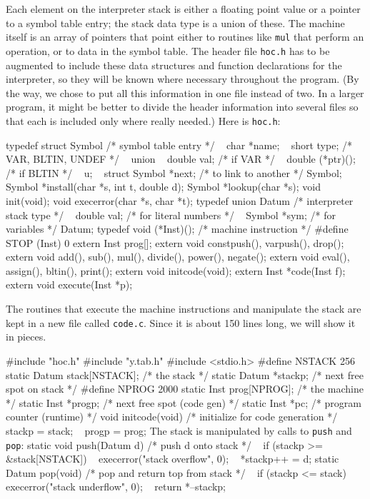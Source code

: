 {Each element on the interpreter stack is either a floating point
value or a pointer to a symbol table entry; the stack data type
is a union of these. The machine itself is an array of pointers
that point either to routines like {\tt mul} that perform an
operation, or to data in the symbol table.
The header file {\tt hoc.h} has to be augmented to include these
data structures and function declarations for the interpreter,
so they will be known where necessary throughout the program.
(By the way, we chose to put all this information in one file
instead of two. In a larger program, it might be better to divide
the header information into several files so that each is included
only where really needed.) Here is {\tt hoc.h}:

\begincode
typedef struct Symbol {  /* symbol table entry */
~       char   *name;
~       short   type;    /* VAR, BLTIN, UNDEF */
~       union {
~               double  val;         /* if VAR */
~               double  (*ptr)();    /* if BLTIN */
~       } u;
~       struct Symbol   *next;  /* to link to another */
} Symbol;
\medbreak
Symbol *install(char *s, int t, double d);
Symbol *lookup(char *s);
\medbreak
void init(void);
void execerror(char *s, char *t);
\medbreak
typedef union Datum {    /* interpreter stack type */
~       double  val;     /* for literal numbers */
~       Symbol *sym;     /* for variables */
} Datum;
\medbreak
typedef void (*Inst)();  /* machine instruction */
#define STOP (Inst) 0
\medbreak
extern  Inst prog[];
extern  void constpush(), varpush(), drop();
extern  void add(), sub(), mul(), divide(), power(), negate();
extern  void eval(), assign(), bltin(), print();
\medbreak
extern  void initcode(void);
extern  Inst *code(Inst f);
extern  void execute(Inst *p);
\endcode


The routines that execute the machine instructions and
manipulate the stack are kept in a new file called {\tt code.c}.
Since it is about 150 lines long, we will show it in pieces.

\begincode
#include "hoc.h"
#include "y.tab.h"
#include <stdio.h>
\medbreak
#define NSTACK  256
static  Datum   stack[NSTACK];  /* the stack */
static  Datum  *stackp;         /* next free spot on stack */
\medbreak
#define NPROG   2000
static  Inst    prog[NPROG];    /* the machine */
static  Inst   *progp;          /* next free spot (code gen) */
static  Inst   *pc;             /* program counter (runtime) */
\medbreak
void initcode(void)  /* initialize for code generation */
{
~       stackp = stack;
~       progp = prog;
}
\endcode
\noindent
The stack is manipulated by calls to {\tt push} and {\tt pop}:
\begincode
static void push(Datum d)  /* push d onto stack */
{
~       if (stackp >= &stack[NSTACK])
~               execerror("stack overflow", 0);
~       *stackp++ = d;
}
\medskip
static Datum pop(void)  /* pop and return top from stack */
{
~       if (stackp <= stack)
~               execerror("stack underflow", 0);
~       return *--stackp;
}
\endcode

}
